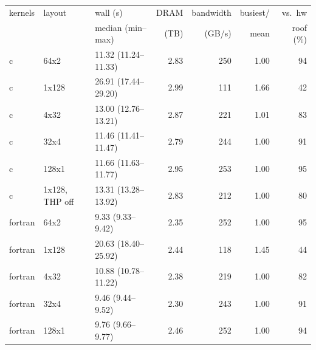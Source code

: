 \begin{tabular}{lllrrrr}
\toprule
kernels & layout & wall (s) & DRAM & bandwidth & busiest/ & vs.\ hw \\
 & & median (min--max) & (TB) & (GB/s) & mean & roof (\%) \\
\midrule
c & 64x2 & 11.32 (11.24--11.33) & 2.83 & 250 & 1.00 & 94 \\
c & 1x128 & 26.91 (17.44--29.20) & 2.99 & 111 & 1.66 & 42 \\
c & 4x32 & 13.00 (12.76--13.21) & 2.87 & 221 & 1.01 & 83 \\
c & 32x4 & 11.46 (11.41--11.47) & 2.79 & 244 & 1.00 & 91 \\
c & 128x1 & 11.66 (11.63--11.77) & 2.95 & 253 & 1.00 & 95 \\
c & 1x128, THP off & 13.31 (13.28--13.92) & 2.83 & 212 & 1.00 & 80 \\
fortran & 64x2 & 9.33 (9.33--9.42) & 2.35 & 252 & 1.00 & 95 \\
fortran & 1x128 & 20.63 (18.40--25.92) & 2.44 & 118 & 1.45 & 44 \\
fortran & 4x32 & 10.88 (10.78--11.22) & 2.38 & 219 & 1.00 & 82 \\
fortran & 32x4 & 9.46 (9.44--9.52) & 2.30 & 243 & 1.00 & 91 \\
fortran & 128x1 & 9.76 (9.66--9.77) & 2.46 & 252 & 1.00 & 94 \\
\bottomrule
\end{tabular}
